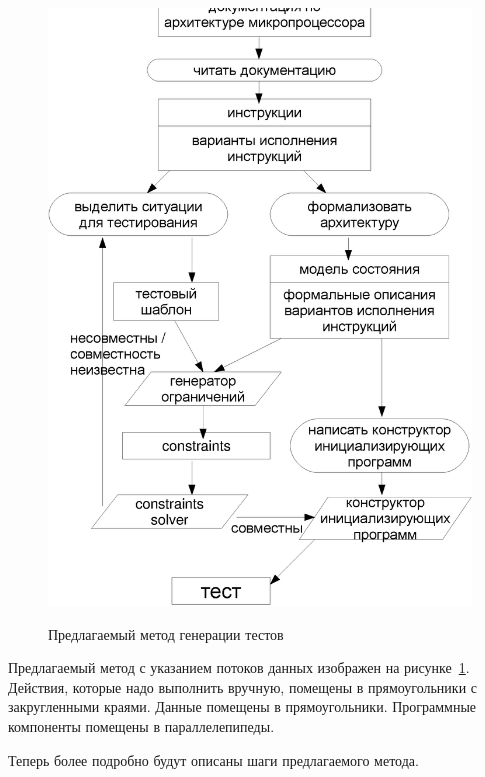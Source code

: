 \documentclass[14pt]{extreport}
\begin{document}
\begin{figure}[p] \center
  \includegraphics[width=\textwidth]{2.theor/process.full.eps}\\
  \caption{Предлагаемый метод генерации тестов}\label{process}
\end{figure}

Предлагаемый метод с указанием потоков данных изображен на рисунке~\ref{process}. Действия, которые надо выполнить вручную, помещены в прямоугольники с закругленными краями. Данные помещены в прямоугольники. Программные компоненты помещены в параллелепипеды.

Теперь более подробно будут описаны шаги предлагаемого метода.
\end{document}
